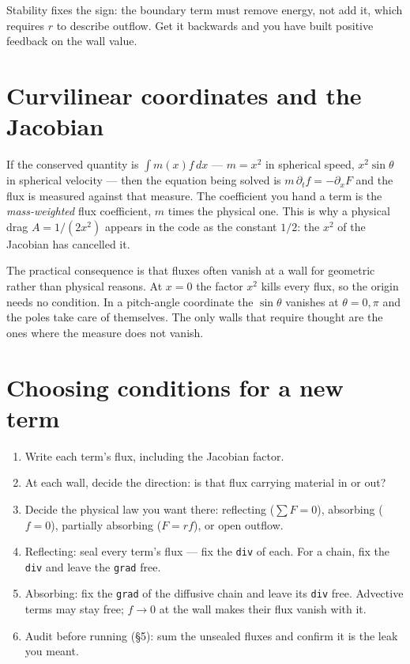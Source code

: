 \documentclass[11pt]{article}
\newcommand{\code}[1]{\texttt{#1}}
\begin{document}
Stability fixes the sign: the boundary term must remove energy, not add it,
which requires $r$ to describe outflow. Get it backwards and you have built
positive feedback on the wall value.

\section{Curvilinear coordinates and the Jacobian}

If the conserved quantity is $\int m(x) f\,dx$ --- $m=x^2$ in spherical speed,
$x^2\sin\theta$ in spherical velocity --- then the equation being solved is
$m\,\partial_t f = -\partial_x F$ and the flux is measured against that measure.
The coefficient you hand a term is the \emph{mass-weighted} flux coefficient,
$m$ times the physical one. This is why a physical drag $A=1/(2x^2)$ appears in
the code as the constant $1/2$: the $x^2$ of the Jacobian has cancelled it.

The practical consequence is that fluxes often vanish at a wall for geometric
rather than physical reasons. At $x=0$ the factor $x^2$ kills every flux, so the
origin needs no condition. In a pitch-angle coordinate the $\sin\theta$ vanishes
at $\theta=0,\pi$ and the poles take care of themselves. The only walls that
require thought are the ones where the measure does not vanish.

\section{Choosing conditions for a new term}

\begin{enumerate}\itemsep2pt
\item Write each term's flux, including the Jacobian factor.
\item At each wall, decide the direction: is that flux carrying material in or
      out?
\item Decide the physical law you want there: reflecting ($\sum F=0$),
      absorbing ($f=0$), partially absorbing ($F=rf$), or open outflow.
\item Reflecting: seal every term's flux --- fix the \code{div} of each. For a
      chain, fix the \code{div} and leave the \code{grad} free.
\item Absorbing: fix the \code{grad} of the diffusive chain and leave its
      \code{div} free. Advective terms may stay free; $f\to0$ at the wall makes
      their flux vanish with it.
\item Audit before running (\S5): sum the unsealed fluxes and confirm it is the
      leak you meant.
\end{enumerate}
\end{document}
